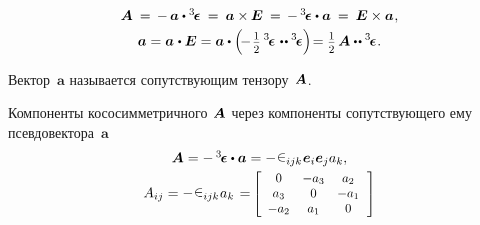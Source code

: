 \begin{otherlanguage}{russian}
\nopagebreak\vspace{-0.1em}\begin{equation}\label{companionvector}
\begin{array}{c}
\bm{A} \:=\, - \, \bm{a} \dotp \levicivitatensor \:=\: \bm{a} \times\hspace{-0.1ex} \bm{E} \:=\, - \, \levicivitatensor \dotp \bm{a} \:=\: \bm{E} \times \bm{a} \hspace{0.1ex},\\[.3em]
%
\bm{a} = \bm{a} \hspace{.1ex} \dotp \bm{E} = \bm{a} \dotp \left( \! - \displaystyle \hspace{0.2ex} \smalldisplaystyleonehalf \hspace{.4ex} \levicivitatensor \hspace{0.2ex} \dotdotp \levicivitatensor \right) \hspace{-0.4ex} = \displaystyle \smalldisplaystyleonehalf \hspace{.32ex} \bm{A} \dotdotp \levicivitatensor \hspace{0.1ex}.
\end{array}
\end{equation}

\vspace{-0.1em} \noindent Вектор~$\bm{a}$ называется сопутствующим тензору~${\hspace{-0.2ex}\bm{A}}$.

Компоненты кососимметричного~${\hspace{-0.2ex}\bm{A}}$ через компоненты сопутствующего ему псевдовектора~$\bm{a}$
\vspace{0.2em}\[\begin{array}{c}
\bm{A} = - \, \levicivitatensor \dotp \bm{a} = - \hspace{0.1ex} \levicivita_{ijk} \hspace{0.1ex} \bm{e}_i \bm{e}_j a_k ,\\[0.3em]
A_{ij} = - \hspace{0.1ex} \levicivita_{ijk} \hspace{0.1ex} a_k \hspace{0.1em} = \hspace{-0.1em}
\scalebox{0.9}[0.9]{$\left[ \begin{array}{ccc}
0 & -a_3 & a_2 \\
a_3 & 0 & -a_1 \\
-a_2 & a_1 & 0
\end{array} \hspace{0.25ex}\right]$}
\end{array}\]


\end{otherlanguage}
